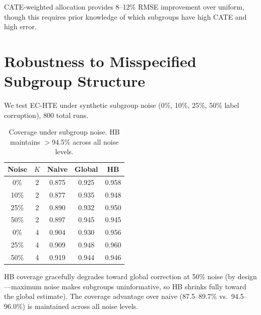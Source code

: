 \documentclass[11pt,twocolumn]{article}
\begin{document}
CATE-weighted allocation provides 8--12\% RMSE improvement over uniform, though this requires prior knowledge of which subgroups have high CATE and high error.

\section{Robustness to Misspecified Subgroup Structure}

We test EC-HTE under synthetic subgroup noise (0\%, 10\%, 25\%, 50\% label corruption), 800 total runs.

\begin{table}[h]
\centering
\small
\caption{Coverage under subgroup noise. HB maintains $>$94.5\% across all noise levels.}
\label{tab:robust}
\begin{tabular}{@{}ccccc@{}}
\toprule
Noise & $K$ & Naive & Global & HB \\
\midrule
0\% & 2 & 0.875 & 0.925 & 0.958 \\
10\% & 2 & 0.877 & 0.935 & 0.948 \\
25\% & 2 & 0.890 & 0.932 & 0.950 \\
50\% & 2 & 0.897 & 0.945 & 0.945 \\
0\% & 4 & 0.904 & 0.930 & 0.956 \\
25\% & 4 & 0.909 & 0.948 & 0.960 \\
50\% & 4 & 0.919 & 0.944 & 0.946 \\
\bottomrule
\end{tabular}
\end{table}

HB coverage gracefully degrades toward global correction at 50\% noise (by design---maximum noise makes subgroups uninformative, so HB shrinks fully toward the global estimate). The coverage advantage over naive (87.5--89.7\% vs.\ 94.5--96.0\%) is maintained across all noise levels.
\end{document}
